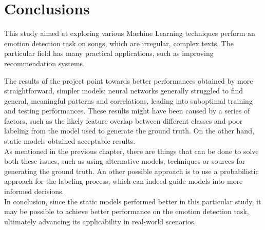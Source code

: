 \chapter*{Conclusions}
\label{ch:conclusions}
This study aimed at exploring various Machine Learning techniques perform an
emotion detection task on songs, which are irregular, complex texts.
The particular field has many practical applications, such as improving
recommendation systems.

The results of the project point towards better performances obtained by more
straightforward, simpler models; neural networks generally struggled to find
general, meaningful patterns and correlations, leading into suboptimal
training and testing performances. These results might have been caused by a series of
factors, such as the likely feature overlap between different classes and
poor labeling from the model used to generate the ground truth. On the other hand, static models obtained
acceptable results.\\

As mentioned in the previous chapter, there are things that can be done to
solve both these issues, such as using alternative models, techniques or
sources for generating the ground truth. An other possible approach
is to use a probabilistic approach for the labeling process, which
can indeed guide models into more informed decisions.\\

In conclusion, since the static models performed better in this particular study,
it may be possible to achieve better performance on the emotion
detection task, ultimately advancing its applicability in real-world scenarios.